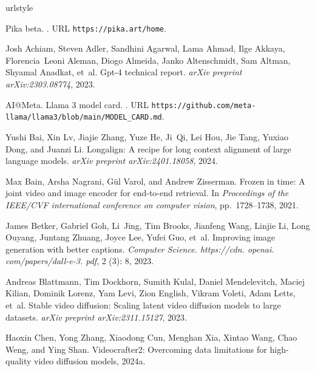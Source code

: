 \documentclass{article} \usepackage{iclr2024_conference,times}
\begin{document}
\begin{thebibliography}{45}
\providecommand{\natexlab}[1]{#1}
\providecommand{\url}[1]{\texttt{#1}}
\expandafter\ifx\csname urlstyle\endcsname\relax
  \providecommand{\doi}[1]{doi: #1}\else
  \providecommand{\doi}{doi: \begingroup \urlstyle{rm}\Url}\fi

Pika beta.
.
\newblock URL \url{https://pika.art/home}.

Josh Achiam, Steven Adler, Sandhini Agarwal, Lama Ahmad, Ilge Akkaya, Florencia~Leoni Aleman, Diogo Almeida, Janko Altenschmidt, Sam Altman, Shyamal Anadkat, et~al.
\newblock Gpt-4 technical report.
\newblock \emph{arXiv preprint arXiv:2303.08774}, 2023.

AI@Meta.
\newblock Llama 3 model card.
.
\newblock URL \url{https://github.com/meta-llama/llama3/blob/main/MODEL_CARD.md}.

Yushi Bai, Xin Lv, Jiajie Zhang, Yuze He, Ji~Qi, Lei Hou, Jie Tang, Yuxiao Dong, and Juanzi Li.
\newblock Longalign: A recipe for long context alignment of large language models.
\newblock \emph{arXiv preprint arXiv:2401.18058}, 2024.

Max Bain, Arsha Nagrani, G{\"u}l Varol, and Andrew Zisserman.
\newblock Frozen in time: A joint video and image encoder for end-to-end retrieval.
\newblock In \emph{Proceedings of the IEEE/CVF international conference on computer vision}, pp.\  1728--1738, 2021.

James Betker, Gabriel Goh, Li~Jing, Tim Brooks, Jianfeng Wang, Linjie Li, Long Ouyang, Juntang Zhuang, Joyce Lee, Yufei Guo, et~al.
\newblock Improving image generation with better captions.
\newblock \emph{Computer Science. https://cdn. openai. com/papers/dall-e-3. pdf}, 2 (3): 8, 2023.

Andreas Blattmann, Tim Dockhorn, Sumith Kulal, Daniel Mendelevitch, Maciej Kilian, Dominik Lorenz, Yam Levi, Zion English, Vikram Voleti, Adam Letts, et~al.
\newblock Stable video diffusion: Scaling latent video diffusion models to large datasets.
\newblock \emph{arXiv preprint arXiv:2311.15127}, 2023.

Haoxin Chen, Yong Zhang, Xiaodong Cun, Menghan Xia, Xintao Wang, Chao Weng, and Ying Shan.
\newblock Videocrafter2: Overcoming data limitations for high-quality video diffusion models, 2024{\natexlab{a}}.


\end{thebibliography}
\end{document}
